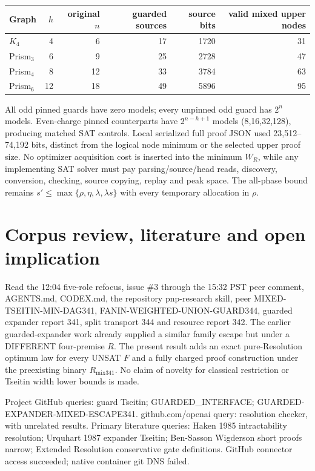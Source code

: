 \documentclass[11pt]{article}
\begin{document}
\begin{center}\begin{tabular}{lrrrrr}\toprule
Graph & $h$ & original $n$ & guarded sources & source bits & valid mixed upper nodes\\\midrule
$K_4$ &4&6&17&1720&31\\
Prism$_3$ &6&9&25&2728&47\\
Prism$_4$ &8&12&33&3784&63\\
Prism$_6$ &12&18&49&5896&95\\\bottomrule
\end{tabular}\end{center}
All odd pinned guards have zero models; every unpinned odd guard has $2^n$ models. Even-charge pinned counterparts have $2^{n-h+1}$ models (8,16,32,128), producing matched SAT controls. Local serialized full proof JSON used 23,512--74,192 bits, distinct from the logical node minimum or the selected upper proof size. No optimizer acquisition cost is inserted into the minimum $W_R$, while any implementing SAT solver must pay parsing/source/head reads, discovery, conversion, checking, source copying, replay and peak space. The all-phase bound remains $s'\le\max\{\rho,\eta,\lambda,\lambda s\}$ with every temporary allocation in $\rho$.

\section*{Corpus review, literature and open implication}
Read the 12:04 five-role refocus, issue \#3 through the 15:32 PST peer comment, AGENTS.md, CODEX.md, the repository pnp-research skill, peer MIXED-TSEITIN-MIN-DAG341, FANIN-WEIGHTED-UNION-GUARD344, guarded expander report 341, split transport 344 and resource report 342. The earlier guarded-expander work already supplied a similar family escape but under a DIFFERENT four-premise $R$. The present result adds an exact pure-Resolution optimum law for every UNSAT $F$ and a fully charged proof construction under the preexisting binary $R_{\mathrm{mix341}}$. No claim of novelty for classical restriction or Tseitin width lower bounds is made.

Project GitHub queries: guard Tseitin; GUARDED_INTERFACE; GUARDED-EXPANDER-MIXED-ESCAPE341. github.com/openai query: resolution checker, with unrelated results. Primary literature queries: Haken 1985 intractability resolution; Urquhart 1987 expander Tseitin; Ben-Sasson Wigderson short proofs narrow; Extended Resolution conservative gate definitions. GitHub connector access succeeded; native container git DNS failed.
\end{document}
